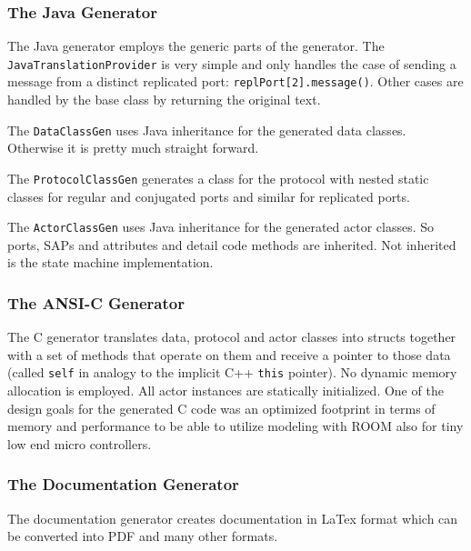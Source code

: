 \subsubsection{The Java Generator}

The Java generator employs the generic parts of the generator. The \texttt{JavaTranslationProvider} is very simple and only handles the case of sending a message from a distinct replicated port: \texttt{replPort[2].message()}. Other cases are handled by the base class by returning the original text.

The \texttt{DataClassGen} uses Java inheritance for the generated data classes. Otherwise it is pretty much straight forward.

The \texttt{ProtocolClassGen} generates a class for the protocol with nested static classes for regular and conjugated ports and similar for replicated ports.

The \texttt{ActorClassGen} uses Java inheritance for the generated actor classes. So ports, SAPs and attributes and detail code methods are inherited. Not inherited is the state machine implementation.

\subsubsection{The ANSI-C Generator}

The C generator translates data, protocol and actor classes into structs together with a set of methods that operate on them and receive a pointer to those data (called \texttt{self} in analogy to the implicit C++ \texttt{this} pointer).
No dynamic memory allocation is employed. All actor instances are statically initialized.
One of the design goals for the generated C code was an optimized footprint in terms of memory and performance to be able to utilize modeling with ROOM also for tiny low end micro controllers.

\subsubsection{The Documentation Generator}

The documentation generator creates documentation in LaTex format which can be converted into PDF and many other formats.
